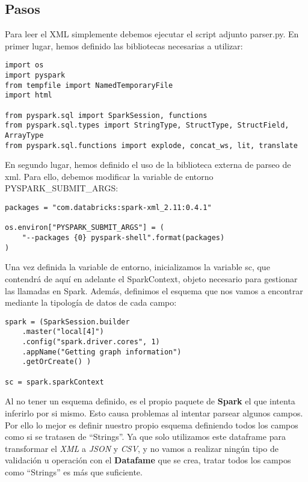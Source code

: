 \subsection{Pasos}

Para leer el XML simplemente debemos ejecutar el script adjunto parser.py. En primer lugar, hemos definido las bibliotecas necesarias a utilizar:

\begin{verbatim}
import os
import pyspark
from tempfile import NamedTemporaryFile
import html

from pyspark.sql import SparkSession, functions
from pyspark.sql.types import StringType, StructType, StructField, ArrayType
from pyspark.sql.functions import explode, concat_ws, lit, translate
\end{verbatim}
 

En segundo lugar, hemos definido el uso de la biblioteca externa de parseo de xml. Para ello, debemos modificar la variable de entorno PYSPARK\_SUBMIT\_ARGS:

\begin{verbatim}
packages = "com.databricks:spark-xml_2.11:0.4.1"

os.environ["PYSPARK_SUBMIT_ARGS"] = (
    "--packages {0} pyspark-shell".format(packages)
)
\end{verbatim}

Una vez definida la variable de entorno, inicializamos la variable sc, que contendrá de aquí en adelante el SparkContext, objeto necesario para gestionar las llamadas en Spark. Además, definimos el esquema que nos vamos a encontrar mediante la tipología de datos de cada campo:

\begin{verbatim}
spark = (SparkSession.builder
    .master("local[4]")
    .config("spark.driver.cores", 1)
    .appName("Getting graph information")
    .getOrCreate() )
    
sc = spark.sparkContext
\end{verbatim}

Al no tener un esquema definido, es el propio paquete de \textbf{Spark} el que intenta inferirlo por si mismo. Esto causa problemas al intentar parsear algunos campos. Por ello lo mejor es definir nuestro propio esquema definiendo todos los campos como si se tratasen de ``Strings''. Ya que solo utilizamos este dataframe para transformar el \textit{XML} a \textit{JSON} y \textit{CSV}, y no vamos a realizar ningún tipo de validación u operación con el \textbf{Datafame} que se crea, tratar todos los campos como ``Strings'' es más que suficiente.

